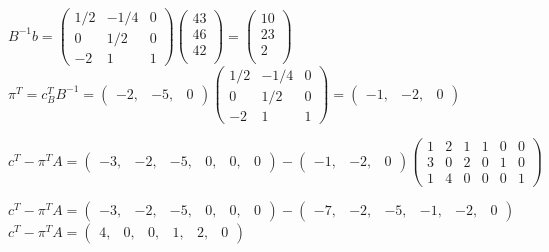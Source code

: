 \documentclass{article}
\begin{document}
\begin{center}
   $B^{-1}b=
   \begin{pmatrix}
      1/2 & -1/4 & 0\\
      0   & 1/2  & 0\\ 
      -2  & 1    & 1
   \end{pmatrix}
   \begin{pmatrix}
     43\\
     46\\
     42\\
   \end{pmatrix}
   =
   \begin{pmatrix}
     10\\
     23\\
     2\\
   \end{pmatrix}$
   \\
   \vspace{5mm} %
   $\pi^T=c^T_B B^{-1}=
   \begin{pmatrix}
      -2,&-5,&0
   \end{pmatrix}
   \begin{pmatrix}
      1/2 & -1/4 & 0\\
      0   & 1/2  & 0\\ 
      -2  & 1    & 1
   \end{pmatrix}
   =
   \begin{pmatrix}
      -1,&-2,&0
   \end{pmatrix}
   $
   \\
   \vspace{5mm} %

   $c^T-\pi^TA=
   \begin{pmatrix}
      -3,&-2,&-5,&0,&0,&0
   \end{pmatrix}
   -
   \begin{pmatrix}
      -1,&-2,&0
   \end{pmatrix}
   \begin{pmatrix}
     1  &  2  &  1  &  1  &  0  &   0  \\
     3  &  0  &  2  &  0  &  1  &   0  \\  
     1  &  4  &  0  &  0  &  0  &  1  
   \end{pmatrix}
   $
   \\
   \vspace{5mm} %

   $c^T-\pi^TA=
   \begin{pmatrix}
      -3,&-2,&-5,&0,&0,&0
   \end{pmatrix}
   -
   \begin{pmatrix}
      -7,&-2,&-5,&-1,&-2,&0
   \end{pmatrix}
   $
   \\
   \vspace{5mm} %
   $c^T-\pi^TA=
   \begin{pmatrix}
      4,&0,&0,&1,&2,&0
   \end{pmatrix}$
   \\
   \vspace{5mm} %
   

\end{center}
\end{document}
